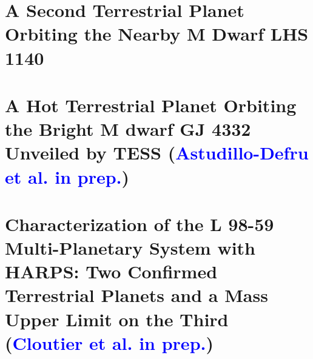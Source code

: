 \section{A Second Terrestrial Planet Orbiting the Nearby M Dwarf LHS 1140
\citep{ment19}}


\section{A Hot Terrestrial Planet Orbiting the Bright M dwarf GJ 4332 Unveiled
  by TESS (\textcolor{blue}{Astudillo-Defru et al. in prep.})}


\section{Characterization of the L 98-59 Multi-Planetary System with HARPS:
  Two Confirmed Terrestrial Planets and a Mass Upper Limit on the Third
  (\textcolor{blue}{Cloutier et al. in prep.})}
